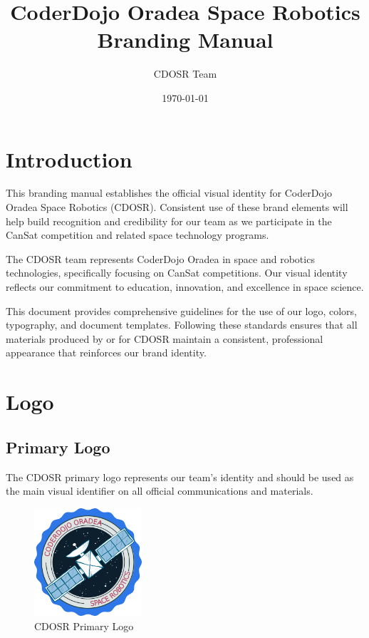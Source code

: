 \documentclass[11pt]{article}
\title{CoderDojo Oradea Space Robotics\\Branding Manual}
\author{CDOSR Team}
\date{\today}
\begin{document}

\newpage
\tableofcontents
\pagestyle{plain}

\newpage
\section{Introduction}

This branding manual establishes the official visual identity for CoderDojo Oradea Space Robotics (CDOSR). Consistent use of these brand elements will help build recognition and credibility for our team as we participate in the CanSat competition and related space technology programs.

The CDOSR team represents CoderDojo Oradea in space and robotics technologies, specifically focusing on CanSat competitions. Our visual identity reflects our commitment to education, innovation, and excellence in space science.

This document provides comprehensive guidelines for the use of our logo, colors, typography, and document templates. Following these standards ensures that all materials produced by or for CDOSR maintain a consistent, professional appearance that reinforces our brand identity.

\section{Logo}

\subsection{Primary Logo}

The CDOSR primary logo represents our team's identity and should be used as the main visual identifier on all official communications and materials.

\begin{figure}[h]
    \centering
    \includegraphics[width=4cm]{img_CDOSR.png}
    \caption{\small{CDOSR Primary Logo}}
    \label{fig:primary-logo}
\end{figure}
\end{document}
